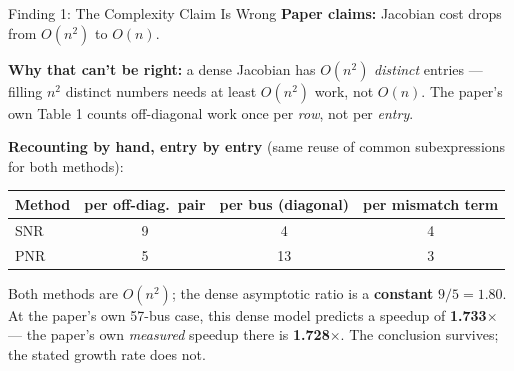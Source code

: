 \documentclass[aspectratio=169,10pt]{beamer}
\begin{document}
\begin{frame}{Finding 1: The Complexity Claim Is Wrong}
  \small
  \textbf{Paper claims:} Jacobian cost drops from $O(n^2)$ to $O(n)$.

  \medskip
  \textbf{Why that can't be right:} a dense Jacobian has $O(n^2)$ \emph{distinct}
  entries --- filling $n^2$ distinct numbers needs at least $O(n^2)$ work,
  not $O(n)$. The paper's own Table 1 counts off-diagonal work once per
  \emph{row}, not per \emph{entry}.

  \medskip
  \textbf{Recounting by hand, entry by entry} (same reuse of common
  subexpressions for both methods):
  \begin{center}
  \begin{tabular}{lccc}
    \toprule
    Method & per off-diag.\ pair & per bus (diagonal) & per mismatch term \\
    \midrule
    SNR & 9 & 4  & 4 \\
    PNR & 5 & 13 & 3 \\
    \bottomrule
  \end{tabular}
  \end{center}
  Both methods are $O(n^2)$; the dense asymptotic ratio is a
  \textbf{constant} $9/5=1.80$. At the paper's own 57-bus case, this dense
  model predicts a speedup of \textbf{1.733$\times$} --- the paper's own
  \emph{measured} speedup there is \textbf{1.728$\times$}. The conclusion
  survives; the stated growth rate does not.
\end{frame}
\end{document}
